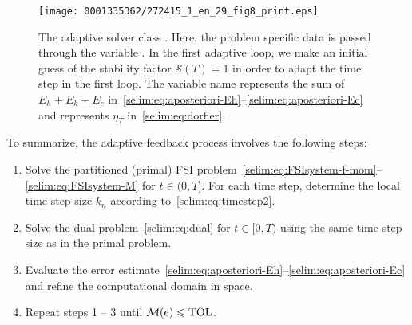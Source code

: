 \begin{figure}[!p]
\centering
\texttt{[image: 0001335362/272415\_1\_en\_29\_fig8\_print.eps]}
  \caption{The adaptive solver class . Here, the
    problem specific data is passed through the variable . In
    the first adaptive loop, we make an initial guess of the stability
    factor $\mathcal{S}(T)=1$ in order to adapt the time step in the
    first loop.  The variable name  represents the sum of
    $E_h + E_k + E_c$ in~\eqref{selim:eq:aposteriori-Eh}--\eqref{selim:eq:aposteriori-Ec} and
     represents $\eta_T$ in~\eqref{selim:eq:dorfler}.}
\label{selim:fig:FSISolver-1}\vspace*{6pt}
\end{figure}

To summarize, the adaptive feedback process involves the following steps:
\begin{enumerate}
  \item Solve the partitioned (primal) FSI
  problem~\eqref{selim:eq:FSIsystem-f-mom}--\eqref{selim:eq:FSIsystem-M}
 for $t\in(0,T]$. For each
  time step, determine the local time step size $k_n$ according
  to~\eqref{selim:eq:timestep2}.

\item Solve the dual problem~\eqref{selim:eq:dual} for $t\in[0,T)$
  using the same time step size as in the primal problem.

\pagebreak

\item Evaluate the error estimate~\eqref{selim:eq:aposteriori-Eh}--\eqref{selim:eq:aposteriori-Ec} and
  refine the computational domain in space.

  \item Repeat steps 1 -- 3 until $\mathcal{M}(e)\leqslant \mathrm{TOL}$.
\end{enumerate}



